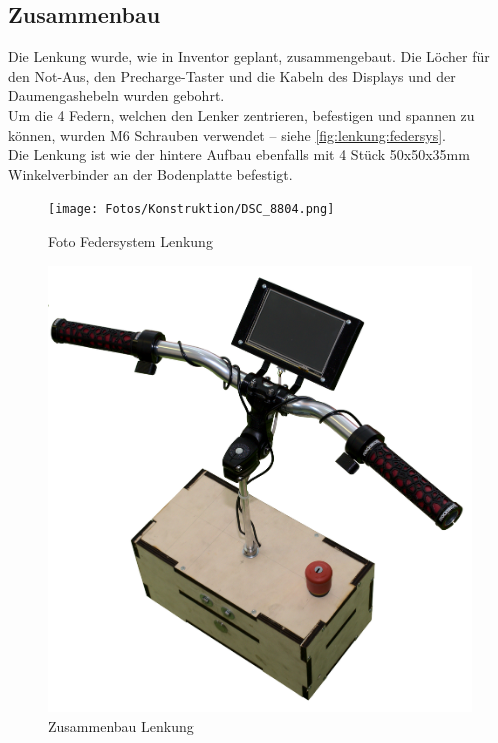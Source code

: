 \subsection{Zusammenbau}
Die Lenkung wurde, wie in Inventor geplant, zusammengebaut. Die Löcher für den Not-Aus, den Precharge-Taster und die Kabeln des Displays und der Daumengashebeln wurden gebohrt.\\
Um die 4 Federn, welchen den Lenker zentrieren, befestigen und spannen zu können, wurden M6 Schrauben verwendet -- siehe \autoref{fig:lenkung:federsys}.\\
Die Lenkung ist wie der hintere Aufbau ebenfalls mit 4 Stück 50x50x35mm Winkelverbinder an der Bodenplatte befestigt.
\begin{figure}[H]
    \centering
    \texttt{[image: Fotos/Konstruktion/DSC\_8804.png]}
    \caption{Foto Federsystem Lenkung \label{fig:lenkung:federsys}}
\end{figure}
\begin{figure}[H]
    \centering
    \includegraphics[width=.99\textwidth]{Fotos/Konstruktion/DSC_8590.png}
    \caption{Zusammenbau Lenkung}
\end{figure}

\clearpage
